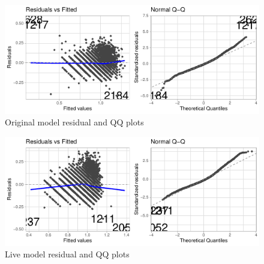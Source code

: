 \documentclass[a4paper,9pt,twocolumn,twoside,]{pinp}
\begin{document}
\begin{figure}

{\centering \includegraphics{005E06-Project-Report_files/figure-latex/original_assumptions-1} 

}

\caption{Original model residual and QQ plots}\label{fig:original_assumptions}
\end{figure}

\begin{figure}

{\centering \includegraphics{005E06-Project-Report_files/figure-latex/live_assumptions-1} 

}

\caption{Live model residual and QQ plots}\label{fig:live_assumptions}
\end{figure}

\showacknow




\end{document}
